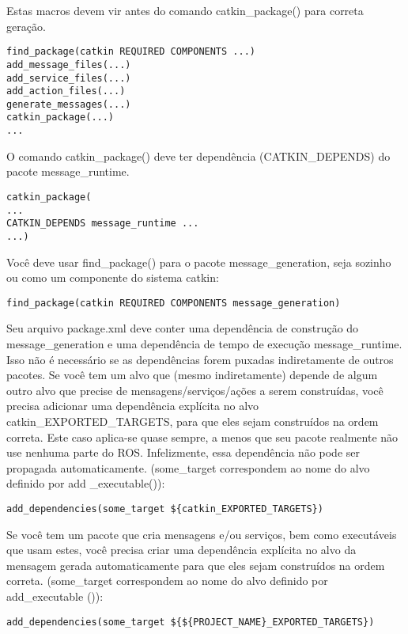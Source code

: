 Estas macros devem vir antes do comando catkin\_package() para correta geração.

\begin{verbatim}
find_package(catkin REQUIRED COMPONENTS ...)
add_message_files(...)
add_service_files(...)
add_action_files(...)
generate_messages(...)
catkin_package(...)
...
\end{verbatim}

O comando catkin\_package() deve ter dependência (CATKIN\_DEPENDS) do pacote message\_runtime.

\begin{verbatim}
catkin_package(
...
CATKIN_DEPENDS message_runtime ...
...)
\end{verbatim}

Você deve usar find\_package() para o pacote message\_generation, seja sozinho ou como um componente do sistema catkin:

\begin{verbatim}
find_package(catkin REQUIRED COMPONENTS message_generation)
\end{verbatim}

Seu arquivo package.xml deve conter uma dependência de construção do message\_generation e uma dependência de tempo de execução message\_runtime. Isso não é necessário se as dependências forem puxadas indiretamente de outros pacotes.
Se você tem um alvo que (mesmo indiretamente) depende de algum outro alvo que precise de mensagens/serviços/ações a serem construídas, você precisa adicionar uma dependência explícita no alvo catkin\_EXPORTED\_TARGETS, para que eles sejam construídos na ordem correta. Este caso aplica-se quase sempre, a menos que seu pacote realmente não use nenhuma parte do ROS. Infelizmente, essa dependência não pode ser propagada automaticamente. (some\_target correspondem ao nome do alvo definido por add \_executable()):

\begin{verbatim}
add_dependencies(some_target ${catkin_EXPORTED_TARGETS})
\end{verbatim}

Se você tem um pacote que cria mensagens e/ou serviços, bem como executáveis que usam estes, você precisa criar uma dependência explícita no alvo da mensagem gerada automaticamente para que eles sejam construídos na ordem correta. (some\_target correspondem ao nome do alvo definido por add\_executable ()):

\begin{verbatim}
add_dependencies(some_target ${${PROJECT_NAME}_EXPORTED_TARGETS})
\end{verbatim}

